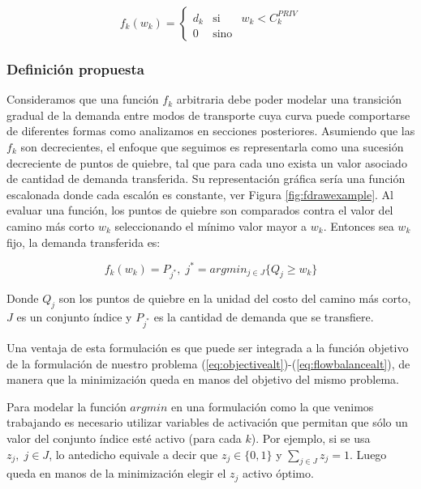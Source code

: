 \documentclass{article}
\begin{document}
  \begin{equation}
    \label{eq:allornothing}
    f_k(w_k) = \left\{ \begin{array}{lcr}
      d_k & \mbox{si}   & w_k < C^{PRIV}_k \\
            0 & \mbox{sino} &
    \end{array}
    \right.
  \end{equation}

  \subsubsection{Definición propuesta}

  Consideramos que una función $f_k$ arbitraria debe poder modelar una transición gradual de la demanda entre modos de transporte cuya curva puede comportarse de diferentes formas como analizamos en secciones posteriores. Asumiendo que las $f_k$ son decrecientes, el enfoque que seguimos es representarla como una sucesión decreciente de puntos de quiebre, tal que para cada uno exista un valor asociado de cantidad de demanda transferida. Su representación gráfica sería una función escalonada donde cada escalón es constante, ver Figura \ref{fig:fdrawexample}. Al evaluar una función, los puntos de quiebre son comparados contra el valor del camino más corto $w_k$ seleccionando el mínimo valor mayor a $w_k$. Entonces sea $w_k$ fijo, la demanda transferida es:

  \begin{equation}
    \label{eq:deffks}
    f_k(w_k) = P_{j^*},\; j^* = argmin_{j \in J} \{Q_j \geq w_k\}
  \end{equation}

  Donde $Q_j$ son los puntos de quiebre en la unidad del costo del camino más corto, $J$ es un conjunto índice y $P_{j^*}$ es la cantidad de demanda que se transfiere.

  Una ventaja de esta formulación es que puede ser integrada a la función objetivo de la formulación de nuestro problema (\ref{eq:objectivealt})-(\ref{eq:flowbalancealt}), de manera que la minimización queda en manos del objetivo del mismo problema.

  Para modelar la función $argmin$ en una formulación como la que venimos trabajando es necesario utilizar variables de activación que permitan que sólo un valor del conjunto índice esté activo (para cada $k$). Por ejemplo, si se usa $z_j,\; j \in J$, lo antedicho equivale a decir que $z_j \in \{0,1\}$ y $\sum_{j \in J} z_j = 1$. Luego queda en manos de la minimización elegir el $z_j$ activo óptimo.
\end{document}
